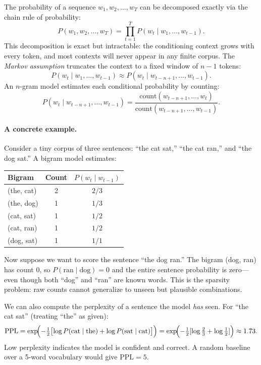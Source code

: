 The probability of a sequence $w_1, w_2, \ldots, w_T$ can be decomposed exactly via the chain rule of probability:
\[
P(w_1, w_2, \ldots, w_T) = \prod_{t=1}^{T} P(w_t \mid w_1, \ldots, w_{t-1}).
\]
This decomposition is exact but intractable: the conditioning context grows with every token, and most contexts will never appear in any finite corpus. The \emph{Markov assumption} truncates the context to a fixed window of $n-1$ tokens:
\[
P(w_t \mid w_1, \ldots, w_{t-1}) \approx P(w_t \mid w_{t-n+1}, \ldots, w_{t-1}).
\]
An $n$-gram model estimates each conditional probability by counting:
\[
P(w_t \mid w_{t-n+1}, \ldots, w_{t-1}) = \frac{\text{count}(w_{t-n+1}, \ldots, w_t)}{\text{count}(w_{t-n+1}, \ldots, w_{t-1})}.
\]

\paragraph{A concrete example.}
Consider a tiny corpus of three sentences: ``the cat sat,'' ``the cat ran,'' and ``the dog sat.'' A bigram model estimates:

\begin{center}
\begin{tabular}{lcc}
\toprule
Bigram & Count & $P(w_t \mid w_{t-1})$ \\
\midrule
(the, cat) & 2 & $2/3$ \\
(the, dog) & 1 & $1/3$ \\
(cat, sat) & 1 & $1/2$ \\
(cat, ran) & 1 & $1/2$ \\
(dog, sat) & 1 & $1/1$ \\
\bottomrule
\end{tabular}
\end{center}

Now suppose we want to score the sentence ``the dog ran.'' The bigram (dog, ran) has count 0, so $P(\text{ran} \mid \text{dog}) = 0$ and the entire sentence probability is zero---even though both ``dog'' and ``ran'' are known words. This is the sparsity problem: raw counts cannot generalize to unseen but plausible combinations.

We can also compute the perplexity of a sentence the model \emph{has} seen. For ``the cat sat'' (treating ``the'' as given):
\[
\text{PPL} = \exp\!\Bigl(-\tfrac{1}{2}\bigl[\log P(\text{cat}\mid\text{the}) + \log P(\text{sat}\mid\text{cat})\bigr]\Bigr) = \exp\!\Bigl(-\tfrac{1}{2}[\log\tfrac{2}{3} + \log\tfrac{1}{2}]\Bigr) \approx 1.73.
\]
Low perplexity indicates the model is confident and correct. A random baseline over a 5-word vocabulary would give $\text{PPL} = 5$.

